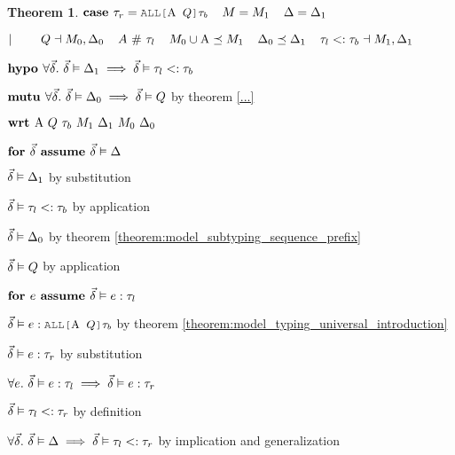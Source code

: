 \documentclass[acmsmall]{acmart}
\theoremstyle{definition}
\newtheorem{theorem}{Theorem}[section]
\begin{document}
\begin{theorem}
    \item \Z $\B{case } 
      \tau_r = \J{ALL[$\Alpha$ $Q$]$\tau_b$}
      \I
      M = M_1
      \I
      \Delta = \Delta_1
    $
    \item \Z $|\ \ \ \ \ \ \ 
      Q \dashv M_0, \Delta_0
      \hspace{4mm}
      A \ \#\  \tau_l
      \hspace{4mm}
      M_0 \cup \mathrm{A} \preceq M_1
      \hspace{4mm}
      \Delta_0 \preceq \Delta_1
      \hspace{4mm}
      \tau_l <: \tau_b
      \dashv M_1, \Delta_1
    $
    \item \Z $\textbf{hypo } 
      \forall \vec{\delta} .\ \vec{\delta} \vDash \Delta_1 \implies \vec{\delta} \vDash \tau_l <: \tau_b 
    $
    \item \Z $\textbf{mutu } 
      \forall \vec{\delta} .\ \vec{\delta} \vDash \Delta_0 \implies \vec{\delta} \vDash Q 
    $ by theorem \ref{...} 
    \item \Z $\B{wrt } \Alpha\ Q\ \tau_b\ M_1\ \Delta_1\ M_0\ \Delta_0$
      \item \Z\Z $\textbf{for } \vec{\delta} \textbf{ assume } \vec{\delta} \vDash \Delta$
        \item \Z\Z\Z $\vec{\delta} \vDash \Delta_1$ by substitution 
        \item \Z\Z\Z $\vec{\delta} \vDash \tau_l <: \tau_b$ by application 
        \item \Z\Z\Z $\vec{\delta} \vDash \Delta_0$ by theorem \ref{theorem:model_subtyping_sequence_prefix} 
        \item \Z\Z\Z $\vec{\delta} \vDash Q$ by application 
        \item \Z\Z\Z $\textbf{for } e \textbf{ assume } \vec{\delta} \vDash e : \tau_l$ 
          \item \Z\Z\Z\Z $\vec{\delta} \satisfies e \hastype \J{ALL[$\Alpha$ $Q$]$\tau_b$}$ by theorem \ref{theorem:model_typing_universal_introduction} 
          \item \Z\Z\Z\Z $\vec{\delta} \vDash e : \tau_r$ by substitution 
        \item \Z\Z\Z $\forall e .\ \vec{\delta} \vDash e : \tau_l 
          \implies \vec{\delta} \vDash e : \tau_r
        $ 
        \item \Z\Z\Z $\vec{\delta} \vDash \tau_l <: \tau_r$ by definition 
      \item \Z\Z $\forall \vec{\delta} .\ \vec{\delta} \vDash \Delta \implies \vec{\delta} \vDash \tau_l <: \tau_r$ 
      by implication and generalization
      \item \Z\Z {} 


\end{theorem}
\end{document}
